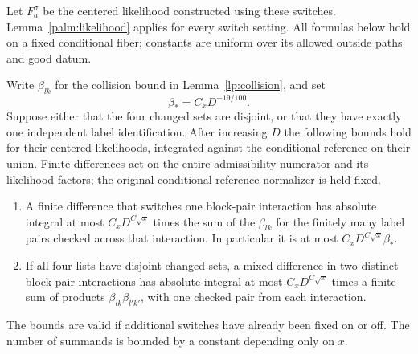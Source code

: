 Let $F_a^{\sigma}$ be the centered likelihood constructed using these
switches.  Lemma~\ref{palm:likelihood} applies for every switch setting.
All formulas below hold on a fixed conditional fiber; constants are
uniform over its allowed outside paths and good datum.

\begin{lemma}
\label{palm:two-switches}
Write $\beta_{lk}$ for the collision bound in
Lemma~\ref{lp:collision}, and set
\[
       \beta_* = C_xD^{-19/100}.
\]
Suppose either that the four changed sets are disjoint, or that they
have exactly one independent label identification.  After increasing $D$
the following bounds hold for their centered likelihoods, integrated
against the conditional reference on their union.  Finite differences
act on the entire admissibility numerator and its likelihood factors;
the original conditional-reference normalizer is held fixed.
\begin{enumerate}
\item A finite difference that switches one block-pair interaction
has absolute integral at most
$C_xD^{C\sqrt x}$ times the sum of the $\beta_{lk}$ for the finitely
many label pairs checked across that interaction.
In particular it is at most $C_xD^{C\sqrt x}\beta_*$.
\item If all four lists have disjoint changed sets, a mixed difference
in two distinct block-pair interactions has absolute integral at most
$C_xD^{C\sqrt x}$ times a finite sum of products
$\beta_{lk}\beta_{l'k'}$, with one checked pair from each interaction.
\end{enumerate}
The bounds are valid if additional switches have already been fixed
on or off.  The number of summands is bounded by a constant depending
only on $x$.
\end{lemma}

